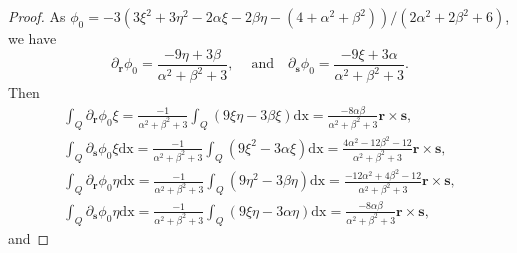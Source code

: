 \documentclass[12pt,showkeys]{amsart}
\begin{document}
\begin{proof}
As $\phi_0=-3(3\xi^2+3\eta^2-2\alpha\xi-2\beta\eta-(4+\alpha^2+\beta^2))/(2\alpha^2+2\beta^2+6)$, we have
$$
\partial_{\mathbf{r}}\phi_0=\frac{-9\eta+3\beta}{\alpha^2+\beta^2+3},\quad \ \mbox{and}\quad \partial_{\mathbf{s}}\phi_0=\frac{-9\xi+3\alpha}{\alpha^2+\beta^2+3}.
$$
Then
$$
\begin{array}{l}
\displaystyle \int_Q\partial_{\mathbf{r}}\phi_0\xi=\frac{-1}{\alpha^2+\beta^2+3}\int_Q(9\xi\eta-3\beta\xi){\mathrm{dx}}=\frac{-8\alpha\beta}{\alpha^2+\beta^2+3}{\mathbf{r}}\times{\mathbf{s}},
\\
\displaystyle \int_Q\partial_{\mathbf{s}}\phi_0\xi{\mathrm{dx}}=\frac{-1}{\alpha^2+\beta^2+3}\int_Q(9\xi^2-3\alpha\xi){\mathrm{dx}}=\frac{4\alpha^2-12\beta^2-12}{\alpha^2+\beta^2+3}{\mathbf{r}}\times{\mathbf{s}},
\\
\displaystyle \int_Q\partial_{\mathbf{r}}\phi_0\eta{\mathrm{dx}}=\frac{-1}{\alpha^2+\beta^2+3}\int_Q(9\eta^2-3\beta\eta){\mathrm{dx}}=\frac{-12\alpha^2+4\beta^2-12}{\alpha^2+\beta^2+3}{\mathbf{r}}\times{\mathbf{s}},
\\
\displaystyle \int_Q\partial_{\mathbf{s}}\phi_0\eta{\mathrm{dx}}=\frac{-1}{\alpha^2+\beta^2+3}\int_Q(9\xi\eta-3\alpha\eta){\mathrm{dx}}=\frac{-8\alpha\beta}{\alpha^2+\beta^2+3}{\mathbf{r}}\times{\mathbf{s}},
\end{array}
$$
and


\end{proof}
\end{document}

